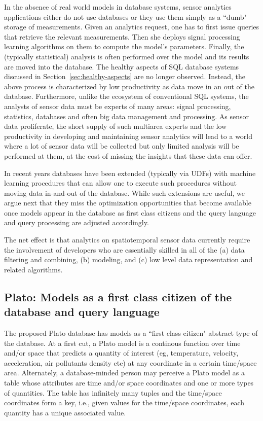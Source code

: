 {In the absence of real world models in database systems, sensor analytics applications either do not use databases or they use them simply as a ``dumb" storage of measurements.
Given an analytics request, one has to first issue queries that retrieve the relevant measurements. Then she deploys signal processing learning algorithms on them to compute the model's parameters. Finally,  the (typically statistical) analysis is often performed over the model and its results are moved into the database. 
The healthy aspects of SQL database systems discussed in Section~\ref{sec:healthy-aspects} are no longer observed. Instead, the above process is characterized by low productivity as data move  in an out of the database. Furthermore, unlike the ecosystem of conventional SQL systems, the analysts of sensor data must be experts of many areas: signal processing, statistics, databases and often big data management and processing. As sensor data proliferate, the short supply of such multiarea experts and the low productivity in developing and maintaining sensor analytics will lead to a world where a lot of sensor data will be collected but only limited analysis will be performed at them, at the cost of missing the insights that these data can offer.


In recent years databases have been extended (typically via UDFs) with machine learning procedures that can allow one to execute such procedures without moving data in-and-out of the database. While such extensions are useful, we argue next that they miss the optimization opportunities that become available once models appear in the database as first class citizens and the query language and query processing are adjusted accordingly.

The net effect is that analytics on spatiotemporal sensor data currently require the involvement of developers who are essentially skilled in all of the (a) data filtering and combining, (b) modeling, and (c) low level data representation and related algorithms. 

\subsection{Plato: Models as a first class citizen of the database and query language}
\label{sec:plato}
The proposed Plato database has models as a ``first class citizen" abstract type of the database. At a first cut, a Plato model is a continous function over time and/or space that predicts a quantity of interest (eg, temperature, velocity, acceleration, air pollutants density etc) at any coordinate in a certain time/space area. Alternately, a database-minded person may perceive a Plato model as a table whose attributes are time and/or space coordinates and one or more types of quantities. The table has infinitely many tuples and the time/space coordinates form a key, i.e.,  given values for the time/space coordinates, each quantity has a unique associated value. 

}
